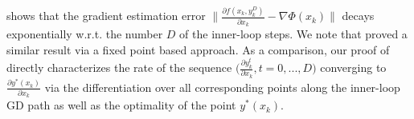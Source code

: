 \documentclass{osudissert96}
\begin{document}
\vspace{-0.4cm}
 shows that the gradient estimation error  $\big\|\frac{\partial f(x_k,y^D_k)}{\partial x_k}-\nabla\Phi(x_k)\big\|$ decays exponentially w.r.t. the number $D$ of the inner-loop steps. 
We note that \cite{grazzi2020iteration} proved a similar result via a fixed point based approach. As a comparison, our proof of  directly characterizes the rate of the sequence  $\big(\frac{\partial y^t_k}{\partial x_k},t=0,...,D\big)$ converging to $\frac{\partial y^*(x_k)}{\partial x_k}$ via the differentiation over all corresponding points along the inner-loop GD path as well as the optimality of the point $y^*(x_k)$. 
\end{document}
